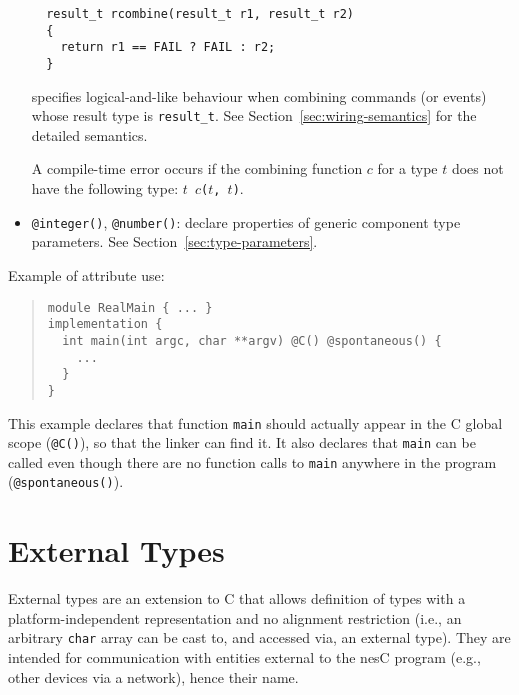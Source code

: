 \documentclass[11pt,letterpaper]{article}
\newcommand{\code}[1]{{\tt #1}}
\newcommand{\nesc}{nesC\xspace}
\begin{document}
\begin{itemize}
\begin{verbatim}
  result_t rcombine(result_t r1, result_t r2)
  {
    return r1 == FAIL ? FAIL : r2;
  }
\end{verbatim}
specifies logical-and-like behaviour when combining commands (or events)
whose result type is \code{result\_t}. See
Section~\ref{sec:wiring-semantics} for the detailed semantics.

A compile-time error occurs if the combining function $c$ for a type $t$
does not have the following type: \code{$t$ $c$($t$, $t$)}.

\item \code{@integer()}, \code{@number()}: declare properties of generic
component type parameters. See Section~\ref{sec:type-parameters}.

\end{itemize}

Example of attribute use:
\begin{quote} \begin{verbatim}
module RealMain { ... }
implementation {
  int main(int argc, char **argv) @C() @spontaneous() {
    ...
  }
}
\end{verbatim} \end{quote}

This example declares that function \code{main} should actually appear
in the C global scope (\code{@C()}), so that the linker can find it. It
also declares that \code{main} can be called even though there are no
function calls to \code{main} anywhere in the program
(\code{@spontaneous()}). 

\section{External Types}
\label{sec:external-types}

External types are an extension to C that allows definition of types with a
platform-independent representation and no alignment restriction (i.e., an
arbitrary \code{char} array can be cast to, and accessed via, an external
type). They are intended for communication with entities external to
the \nesc program (e.g., other devices via a network), hence their name.
\end{document}
